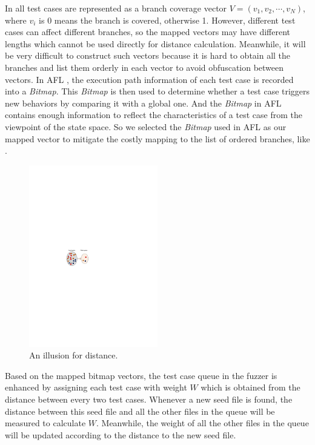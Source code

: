 In \cite{wang2015similarity} all test cases are represented as a branch coverage vector $\mathit{V}=(v_1, v_2, \cdots, v_N)$, where $v_i$ is 0 means the branch is covered, otherwise 1. 
However, different test cases can affect different branches, so the mapped vectors may have different lengths which cannot be used directly for distance calculation. Meanwhile, it will be very difficult to construct such vectors because it is hard to obtain all the branches and list them orderly in each vector to avoid obfuscation between vectors. 
In AFL \cite{online:afl}, the execution path information of each test case is recorded into a \emph{Bitmap}. This \emph{Bitmap} is then used to determine whether a test case triggers new behaviors by comparing it with a global one. And the \emph{Bitmap} in AFL contains enough information to reflect the characteristics of a test case from the viewpoint of the state space. 
So we selected the \emph{Bitmap} used in AFL as our mapped vector to mitigate the costly mapping to the list of ordered branches, like \cite{wang2015similarity}.

\begin{figure}
\centering
\includegraphics[width=0.5\textwidth]{figures/distance-illusion.pdf} 
\caption{An illusion for distance.}\label{distance-illusion}
\end{figure}

Based on the mapped bitmap vectors, the test case queue in the fuzzer is enhanced by assigning each test case with weight $W$ which is obtained from the distance between every two test cases. Whenever a new seed file is found, the distance between this seed file and all the other files in the queue will be measured to calculate $W$. Meanwhile, the weight of all the other files in the queue will be updated according to the distance to the new seed file. 

